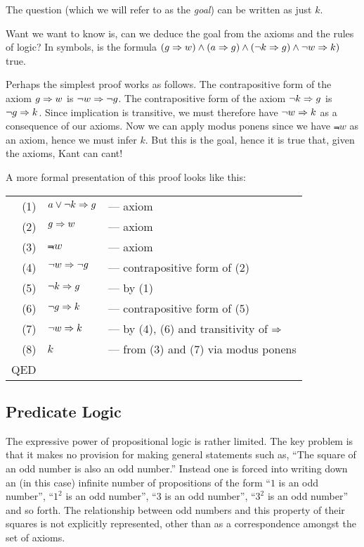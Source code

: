 The question (which we will refer to as the \emph{goal}) can be written
as just $k$.

Want we want to know is, can we deduce the goal from the axioms and the
rules of logic?  In symbols, is the formula
$(g \Rightarrow w) \wedge (a \Rightarrow g) \wedge (\neg{}k \Rightarrow g) \wedge \neg{}w \Rightarrow k)$
true.

Perhaps the simplest proof works as follows.  The contrapositive form of
the axiom $g \Rightarrow w$ is $\neg{}w \Rightarrow \neg{}g$.  The contrapositive form
of the axiom $\neg{}k \Rightarrow g$ is $\neg{}g \Rightarrow k$.  Since implication is
transitive, we must therefore have $\neg{}w \Rightarrow k$ as a consequence of
our axioms.  Now we can apply modus ponens since we have $\Not{w}$ as an
axiom, hence we must infer $k$.  But this is the goal, hence it is true
that, given the axioms, Kant can cant!

A more formal presentation of this proof looks like this:\\
\begin{tabular}{rll}
(1) & $a \vee \neg{}k \Rightarrow g$ & --- axiom \\
(2) & $g \Rightarrow w$ & --- axiom \\
(3) & $\Not{w}$ & --- axiom \\
(4) & $\neg{}w \Rightarrow \neg{}g$ & --- contrapositive form of (2) \\
(5) & $\neg{}k \Rightarrow g$ & --- by (1) \\
(6) & $\neg{}g \Rightarrow k$ & --- contrapositive form of (5) \\
(7) & $\neg{}w \Rightarrow k$ & --- by (4), (6) and transitivity of $\Rightarrow$ \\
(8) & $k$ & --- from (3) and (7) via modus ponens \\
QED \\
\end{tabular}

\subsection{Predicate Logic}

The expressive power of propositional logic is rather limited.  The key
problem is that it makes no provision for making general statements such
as, ``The square of an odd number is also an odd number.''  Instead one
is forced into writing down an (in this case) infinite number of
propositions of the form ``$1$ is an odd number'', ``$1^2$ is an odd
number'', ``$3$ is an odd number'', ``$3^2$ is an odd number'' and so
forth.  The relationship between odd numbers and this property of their
squares is not explicitly represented, other than as a correspondence
amongst the set of axioms.

